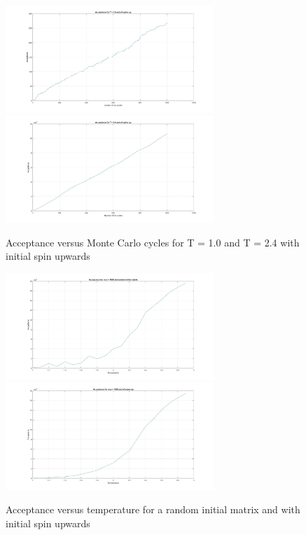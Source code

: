 \documentclass[10pt,a4paper]{article}
\begin{document}
\begin{figure}[H]
\centerline{
\includegraphics[width=0.7\textwidth]{acceptanceMCT1upspin}
\includegraphics[width=0.7\textwidth]{acceptanceMCT24upspin}
}
\caption{Acceptance versus Monte Carlo cycles for T = 1.0 and T = 2.4 with initial spin upwards}
\label{fig:acceptanceupspin}
\end{figure}

\begin{figure}[H]
\centerline{
\includegraphics[width=0.7\textwidth]{acceptanceVStrandom}
\includegraphics[width=0.7\textwidth]{acceptanceVStupspin}
}
\caption{Acceptance versus temperature for a random initial matrix and with initial spin upwards}
\label{fig:acceptancetemp}
\end{figure}
\end{document}
